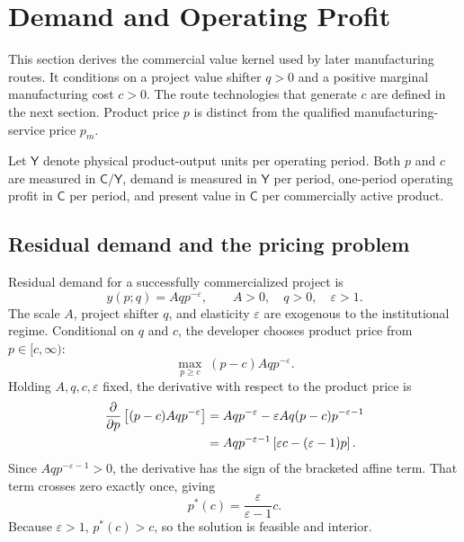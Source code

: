 \section{Demand and Operating Profit}
\label{sec:p02-demand-profit}

This section derives the commercial value kernel used by later manufacturing
routes. It conditions on a project value shifter \(q>0\) and a positive
marginal manufacturing cost \(c>0\). The route technologies that generate
\(c\) are defined in the next section. Product price \(p\) is distinct
from the qualified manufacturing-service price \(p_m\).

Let \(\mathsf Y\) denote physical product-output units per operating period.
Both \(p\) and \(c\) are measured in \(\mathsf C/\mathsf Y\), demand is
measured in \(\mathsf Y\) per period, one-period operating profit in
\(\mathsf C\) per period, and present value in \(\mathsf C\) per commercially
active product.

\subsection{Residual demand and the pricing problem}
\label{subsec:p02-demand-pricing}

Residual demand for a successfully commercialized project is
\begin{equation}
  y(p;q)=Aq p^{-\varepsilon},
  \qquad A>0,\quad q>0,\quad \varepsilon>1.
  \label{eq:p02-demand}
\end{equation}
The scale \(A\), project shifter \(q\), and elasticity \(\varepsilon\) are
exogenous to the institutional regime. Conditional on \(q\) and \(c\), the
developer chooses product price from \(p\in[c,\infty)\):
\begin{equation}
  \max_{p\geq c}\;(p-c)Aq p^{-\varepsilon}.
  \label{eq:p02-pricing-problem}
\end{equation}
Holding \(A,q,c,\varepsilon\) fixed, the derivative with respect to the
product price is
\begin{align}
  \frac{\partial}{\partial p}
  \left[(p-c)Aq p^{-\varepsilon}\right]
  &=Aq p^{-\varepsilon}
    -\varepsilon Aq(p-c)p^{-\varepsilon-1} \notag\\
  &=Aq p^{-\varepsilon-1}
    \left[\varepsilon c-(\varepsilon-1)p\right].
  \label{eq:p02-price-foc}
\end{align}
Since \(Aq p^{-\varepsilon-1}>0\), the derivative has the sign of the
bracketed affine term. That term crosses zero exactly once, giving
\begin{equation}
  p^*(c)=\frac{\varepsilon}{\varepsilon-1}c.
  \label{eq:p02-optimal-price}
\end{equation}
Because \(\varepsilon>1\), \(p^*(c)>c\), so the solution is feasible and
interior.

